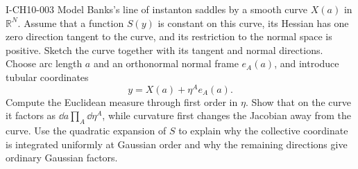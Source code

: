 \begin{exercise}{I-CH10-003}
Model Banks's line of instanton saddles by a smooth curve $X(a)$ in
$\mathbb R^N$.  Assume that a function $S(y)$ is constant on this curve, its
Hessian has one zero direction tangent to the curve, and its restriction to
the normal space is positive.  Sketch the curve together with its tangent and
normal directions.  Choose arc length $a$ and an orthonormal normal frame
$e_A(a)$, and introduce tubular coordinates
\[
  y=X(a)+\eta^A e_A(a).
\]
Compute the Euclidean measure through first order in $\eta$.  Show that on the
curve it factors as $\dd a\prod_A\dd\eta^A$, while curvature first changes the
Jacobian away from the curve.  Use the quadratic expansion of $S$ to explain
why the collective coordinate is integrated uniformly at Gaussian order and
why the remaining directions give ordinary Gaussian factors.
\end{exercise}

